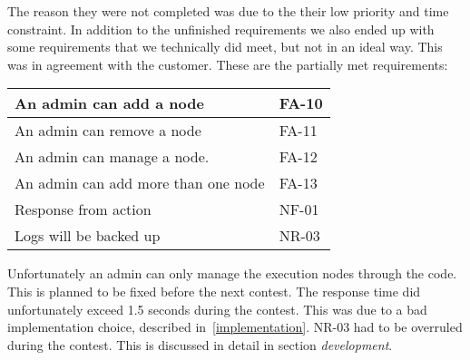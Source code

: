 The reason they were not completed was due to the their low priority and
time constraint. In addition to the unfinished requirements we also ended up with some
requirements that we technically did meet, but not in an ideal way.
This was in agreement with the customer. These are the partially met
requirements:

\begin{supertabular}{|l|l|}
    \hline
    An admin can add a node & FA-10 \\
    \hline
    An admin can remove a node & FA-11 \\
    \hline
    An admin can manage a node.  & FA-12 \\
    \hline
    An admin can add more than one node & FA-13 \\
    \hline
    Response from action & NF-01 \\
    \hline
    Logs will be backed up & NR-03 \\
    \hline
\end{supertabular}

Unfortunately an admin can only manage the execution nodes through the
code. This is planned to be fixed before the next contest. The response
time did unfortunately exceed 1.5 seconds during the contest. This was
due to a bad implementation choice, described in~\ref{implementation}. NR-03
had to be overruled during the contest.  This is discussed in detail in section
\textit{development}.
